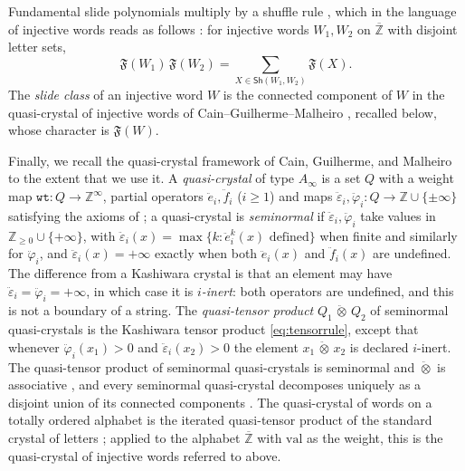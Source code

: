 \documentclass[pdflatex,sn-mathphys-num]{sn-jnl}
\numberwithin{equation}{subsection}
\newcommand{\wtt}{\mathtt{wt}}
\theoremstyle{thmstyleone}
\theoremstyle{thmstylethree}
\theoremstyle{thmstyletwo}
\begin{document}
Fundamental slide polynomials multiply by a shuffle rule \cite[Theorem~5.11]{assaf2017slide}, which in the language of injective words reads as follows \cite[\S5]{nadeau2024ppartitions}: for injective words $W_1,W_2$ on $\overline{\mathbb Z}$ with disjoint letter sets,
\begin{equation}\label{eq:slideshuffle}
\mathfrak F(W_1)\,\mathfrak F(W_2) = \sum_{X\in\mathsf{Sh}(W_1,W_2)}\mathfrak F(X).
\end{equation}
The \emph{slide class} of an injective word $W$ is the connected component of $W$ in the quasi-crystal of injective words of Cain--Guilherme--Malheiro \cite[\S5]{cain2023quasicrystals}, recalled below, whose character is $\mathfrak F(W)$.

Finally, we recall the quasi-crystal framework of Cain, Guilherme, and Malheiro \cite{cain2023quasicrystals} to the extent that we use it. A \emph{quasi-crystal} of type $A_\infty$ is a set $Q$ with a weight map $\wtt:Q\to\mathbb{Z}^\infty$, partial operators $\ddot e_i,\ddot f_i$ ($i\geq 1$) and maps $\ddot\varepsilon_i,\ddot\varphi_i:Q\to\mathbb{Z}\cup\{\pm\infty\}$ satisfying the axioms of \cite[Definition~3.1]{cain2023quasicrystals}; a quasi-crystal is \emph{seminormal} \cite[Definition~3.9]{cain2023quasicrystals} if $\ddot\varepsilon_i,\ddot\varphi_i$ take values in $\mathbb{Z}_{\geq 0}\cup\{+\infty\}$, with $\ddot\varepsilon_i(x)=\max\{k:\ddot e_i^k(x)\text{ defined}\}$ when finite and similarly for $\ddot\varphi_i$, and $\ddot\varepsilon_i(x)=+\infty$ exactly when both $\ddot e_i(x)$ and $\ddot f_i(x)$ are undefined. The difference from a Kashiwara crystal is that an element may have $\ddot\varepsilon_i=\ddot\varphi_i=+\infty$, in which case it is \emph{$i$-inert}: both operators are undefined, and this is not a boundary of a string. The \emph{quasi-tensor product} $Q_1\,\ddot\otimes\,Q_2$ of seminormal quasi-crystals \cite[\S5]{cain2023quasicrystals} is the Kashiwara tensor product \eqref{eq:tensorrule}, except that whenever $\ddot\varphi_i(x_1)>0$ and $\ddot\varepsilon_i(x_2)>0$ the element $x_1\,\ddot\otimes\,x_2$ is declared $i$-inert. The quasi-tensor product of seminormal quasi-crystals is seminormal and $\ddot\otimes$ is associative \cite[Theorem~5.1]{cain2023quasicrystals}, and every seminormal quasi-crystal decomposes uniquely as a disjoint union of its connected components \cite[Proposition~4.6]{cain2023quasicrystals}. The quasi-crystal of words on a totally ordered alphabet is the iterated quasi-tensor product of the standard crystal of letters \cite[\S5]{cain2023quasicrystals}; applied to the alphabet $\overline{\mathbb Z}$ with $\mathrm{val}$ as the weight, this is the quasi-crystal of injective words referred to above.
\end{document}
